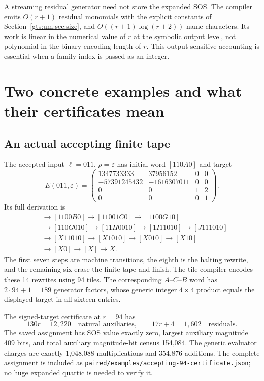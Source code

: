 \documentclass[11pt,letterpaper]{article}
\theoremstyle{definition}
\theoremstyle{remark}
\newcommand{\code}[1]{\nolinkurl{#1}}
\newcommand{\eps}{\varepsilon}
\newcommand{\hto}{\mathrel{\longrightarrow}}
\begin{document}
A streaming residual generator need not store the expanded SOS. The compiler emits $O(r+1)$ residual monomials with the explicit constants of Section~\ref{gts:um:sec:size}, and $O((r+1)\log(r+2))$ name characters. Its work is linear in the numerical value of $r$ at the symbolic output level, not polynomial in the binary encoding length of $r$. This output-sensitive accounting is essential when a family index is passed as an integer.

\section{Two concrete examples and what their certificates mean}
\label{gts:um:sec:examples}
\subsection{An actual accepting finite tape}
The accepted input $\ell=011$, $\rho=\eps$ has initial word $[110A0]$ and target
\[
 E(011,\eps)=
 \begin{pmatrix}
 1347733333&37956152&0&0\\
 -57391245432&-1616307011&0&0\\
 0&0&1&2\\0&0&0&1
 \end{pmatrix}.
\]
Its full derivation is
\begin{align*}
 [110A0]&\hto[1100B0]\hto[11001C0]\hto[1100G10]\\
 &\hto[110G010]\hto[11H0010]\hto[1I11010]\hto[J111010]\\
 &\hto[X11010]\hto[X1010]\hto[X010]\hto[X10]\\
 &\hto[X0]\hto[X]\hto X.
\end{align*}
The first seven steps are machine transitions, the eighth is the halting rewrite, and the remaining six erase the finite tape and finish. The tile compiler encodes these 14 rewrites using 94 tiles. The corresponding $A$--$C$--$B$ word has $2\cdot94+1=189$ generator factors, whose generic integer $4\times4$ product equals the displayed target in all sixteen entries.

The signed-target certificate at $r=94$ has
\[
 130r=12{,}220\quad\text{natural auxiliaries},\qquad
 17r+4=1{,}602\quad\text{residuals}.
\]
The saved assignment has SOS value exactly zero, largest auxiliary magnitude 409 bits, and total auxiliary magnitude-bit census 154,084. The generic evaluator charges are exactly 1,048,088 multiplications and 354,876 additions. The complete assignment is included as \code{paired/examples/accepting-94-certificate.json}; no huge expanded quartic is needed to verify it.
\end{document}
